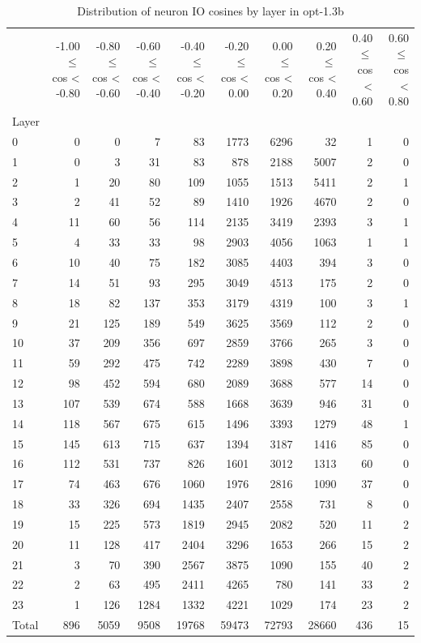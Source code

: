 \begin{table}
\caption{Distribution of neuron IO cosines by layer in opt-1.3b}
\label{tab:opt-1.3b_half_coarse}
\begin{tabular}{lrrrrrrrrr}
 & -1.00 $\leq$ cos < -0.80 & -0.80 $\leq$ cos < -0.60 & -0.60 $\leq$ cos < -0.40 & -0.40 $\leq$ cos < -0.20 & -0.20 $\leq$ cos < 0.00 & 0.00 $\leq$ cos < 0.20 & 0.20 $\leq$ cos < 0.40 & 0.40 $\leq$ cos < 0.60 & 0.60 $\leq$ cos < 0.80 \\
Layer &  &  &  &  &  &  &  &  &  \\
0 & 0 & 0 & 7 & 83 & 1773 & 6296 & 32 & 1 & 0 \\
1 & 0 & 3 & 31 & 83 & 878 & 2188 & 5007 & 2 & 0 \\
2 & 1 & 20 & 80 & 109 & 1055 & 1513 & 5411 & 2 & 1 \\
3 & 2 & 41 & 52 & 89 & 1410 & 1926 & 4670 & 2 & 0 \\
4 & 11 & 60 & 56 & 114 & 2135 & 3419 & 2393 & 3 & 1 \\
5 & 4 & 33 & 33 & 98 & 2903 & 4056 & 1063 & 1 & 1 \\
6 & 10 & 40 & 75 & 182 & 3085 & 4403 & 394 & 3 & 0 \\
7 & 14 & 51 & 93 & 295 & 3049 & 4513 & 175 & 2 & 0 \\
8 & 18 & 82 & 137 & 353 & 3179 & 4319 & 100 & 3 & 1 \\
9 & 21 & 125 & 189 & 549 & 3625 & 3569 & 112 & 2 & 0 \\
10 & 37 & 209 & 356 & 697 & 2859 & 3766 & 265 & 3 & 0 \\
11 & 59 & 292 & 475 & 742 & 2289 & 3898 & 430 & 7 & 0 \\
12 & 98 & 452 & 594 & 680 & 2089 & 3688 & 577 & 14 & 0 \\
13 & 107 & 539 & 674 & 588 & 1668 & 3639 & 946 & 31 & 0 \\
14 & 118 & 567 & 675 & 615 & 1496 & 3393 & 1279 & 48 & 1 \\
15 & 145 & 613 & 715 & 637 & 1394 & 3187 & 1416 & 85 & 0 \\
16 & 112 & 531 & 737 & 826 & 1601 & 3012 & 1313 & 60 & 0 \\
17 & 74 & 463 & 676 & 1060 & 1976 & 2816 & 1090 & 37 & 0 \\
18 & 33 & 326 & 694 & 1435 & 2407 & 2558 & 731 & 8 & 0 \\
19 & 15 & 225 & 573 & 1819 & 2945 & 2082 & 520 & 11 & 2 \\
20 & 11 & 128 & 417 & 2404 & 3296 & 1653 & 266 & 15 & 2 \\
21 & 3 & 70 & 390 & 2567 & 3875 & 1090 & 155 & 40 & 2 \\
22 & 2 & 63 & 495 & 2411 & 4265 & 780 & 141 & 33 & 2 \\
23 & 1 & 126 & 1284 & 1332 & 4221 & 1029 & 174 & 23 & 2 \\
Total & 896 & 5059 & 9508 & 19768 & 59473 & 72793 & 28660 & 436 & 15 \\
\end{tabular}
\end{table}
